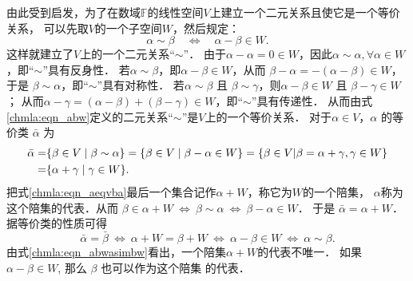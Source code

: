 由此受到启发，为了在数域$\mathbb{F}$的线性空间$V$上建立一个二元关系且使它是一个等价关系，
可以先取$V$的一个子空间$W$，然后规定：
\begin{equation}\label{chmla:eqn_abw}
    \alpha \sim \beta \quad \Leftrightarrow\quad  \alpha-\beta \in W .
\end{equation}
这样就建立了$V$上的一个二元关系“$\sim$”．
由于$\alpha-\alpha=0 \in W$，因此$\alpha \sim \alpha, \forall \alpha \in W$，即“$\sim$”具有反身性．
若$\alpha \sim \beta$，即$\alpha-\beta \in W$，从而 $\beta-\alpha=-(\alpha-\beta) \in W$，
于是 $\beta \sim \alpha$，即“$\sim$”具有对称性．
若$\alpha \sim \beta$ 且 $\beta\sim \gamma$，则$\alpha-\beta \in W$ 且 $\beta-\gamma \in W$；
从而$\alpha-\gamma=(\alpha-\beta)+(\beta-\gamma) \in W$，即“$\sim$”具有传递性．
从而由式\eqref{chmla:eqn_abw}定义的二元关系“$\sim$”是$V$上的一个{\kaishu 等价关系}．
对于$\alpha \in V$，$\alpha$ 的等价类 $\bar{\alpha}$ 为
\begin{align}
    \bar{\alpha} =&\{\beta \in V \mid \beta \sim \alpha\} 
     =\{\beta \in V \mid \beta-\alpha \in W\} 
     =\{\beta \in V|\beta=\alpha+\gamma, \gamma \in W \} \notag \\
     =&\{\alpha+\gamma \mid \gamma \in W\} . \label{chmla:eqn_aeqvba}
\end{align}
把式\eqref{chmla:eqn_aeqvba}最后一个集合记作$\alpha+W$，称它为$W$的一个{\heiti 陪集}，
$\alpha$称为这个陪集的{\kaishu 代表}．从而
$    \beta \in \alpha+W \ \Leftrightarrow \ \beta \sim \alpha  \ \Leftrightarrow \ \beta-\alpha \in W $．
于是 $\bar{\alpha}= \alpha+W $．
据等价类的性质可得
\begin{equation}\label{chmla:eqn_abwasimbw}
    \bar{\alpha}=\bar{\beta}\ \Leftrightarrow\  \alpha+W=\beta+W \ \Leftrightarrow\ 
    \alpha-\beta \in W \ \Leftrightarrow \  \alpha \sim \beta.
\end{equation}
由式\eqref{chmla:eqn_abwasimbw}看出，一个陪集$\alpha+W$的代表不唯一．
如果 $\alpha-\beta \in W$, 那么 $\beta$ 也可以作为这个陪集 的代表．

